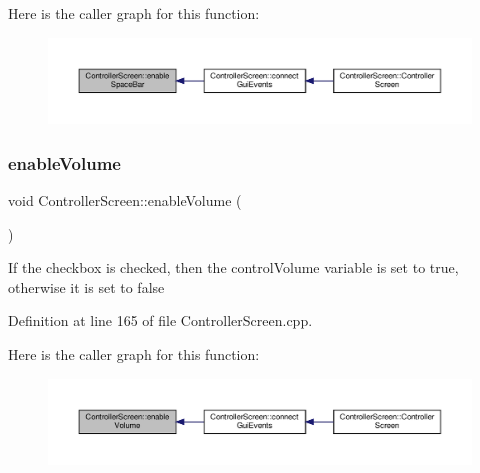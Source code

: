 Here is the caller graph for this function\+:
\nopagebreak
\begin{figure}[H]
\begin{center}
\leavevmode
\includegraphics[width=350pt]{class_controller_screen_aa75c31cfb62427bba649b30e58130bfc_icgraph}
\end{center}
\end{figure}
\mbox{\label{class_controller_screen_ae08e0ea89830d8018ff9086e4c4362a5}} 
\subsubsection{\texorpdfstring{enable\+Volume}{enableVolume}}
{\footnotesize\ttfamily void Controller\+Screen\+::enable\+Volume (\begin{DoxyParamCaption}{ }\end{DoxyParamCaption})\hspace{0.3cm}{\ttfamily [slot]}}

If the checkbox is checked, then the control\+Volume variable is set to true, otherwise it is set to false 

Definition at line 165 of file Controller\+Screen.\+cpp.

Here is the caller graph for this function\+:
\nopagebreak
\begin{figure}[H]
\begin{center}
\leavevmode
\includegraphics[width=350pt]{class_controller_screen_ae08e0ea89830d8018ff9086e4c4362a5_icgraph}
\end{center}
\end{figure}
\mbox{\label{class_controller_screen_afbb0033f9be00fce83d54f2a49b9ba89}} 
